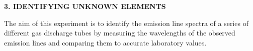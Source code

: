 \documentclass[12pt]{article}
\begin{document}






\bigskip

\bigskip
{\bf 3. IDENTIFYING UNKNOWN ELEMENTS}

\noindent
The aim of this experiment is to identify the emission line spectra of a series of different gas discharge tubes by measuring the wavelengths of the observed emission lines and comparing them to accurate laboratory values.
\end{document}

